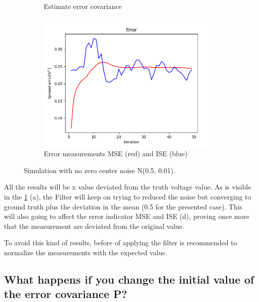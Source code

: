 \documentclass{article}
\begin{document}
\begin{figure}[H]
\begin{subfigure} {.5\textwidth}
            \caption{Estimate error covariance}
        \end{subfigure}
        \begin{subfigure}{.5\textwidth}            
            \centering
            \includegraphics[width=0.6\linewidth]{./img/nc_E.png}
            \caption{Error measurements MSE (red) and ISE (blue)}
        \end{subfigure}
        \caption{Simulation with no zero center noise N(0.5, 0.01).}
        \label{fig:simulation6}
    \end{figure}

        All the results will be x value deviated from the truth voltage value. As is visible in
        the \ref{fig:simulation6} (a), the Filter will keep on trying to reduced the noise but 
        converging to ground truth plus the deviation in the mean (0.5 for the presented case). This will
        also going to affect the error indicator MSE and ISE (d), proving once more that the measurement are deviated from
        the original value. 

        To avoid this kind of results, before of applying the filter is recommended to normalize the measurements with the
        expected value.
    
    \subsection{What happens if you change the initial value of the error covariance P?}
        
\end{document}
